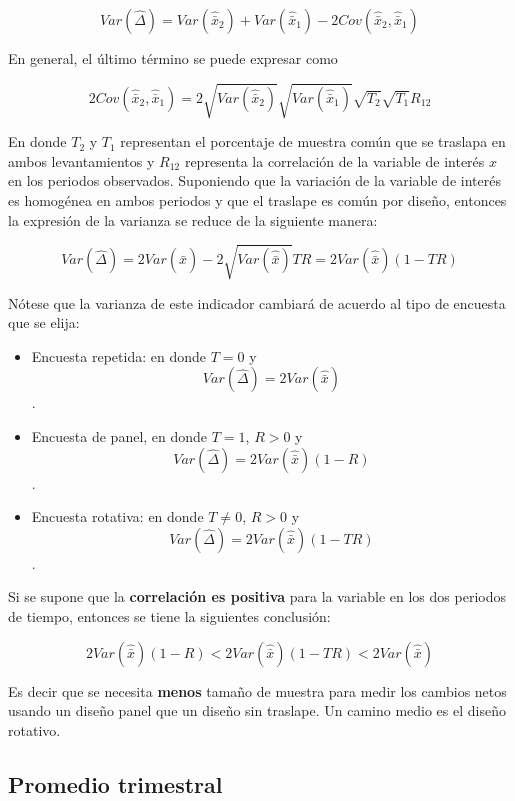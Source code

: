 \documentclass[
  12pt,
  spanish,
]{book}
\providecommand{\tightlist}{%
  \setlength{\itemsep}{0pt}\setlength{\parskip}{0pt}}
\begin{document}
\[
Var(\hat{\Delta}) = Var(\hat{\bar{x}}_2) + Var(\hat{\bar{x}}_1) - 2Cov(\hat{\bar{x}}_2, \hat{\bar{x}}_1)
\]

En general, el último término se puede expresar como

\[
2Cov(\hat{\bar{x}}_2, \hat{\bar{x}}_1) = 
2\sqrt{Var(\hat{\bar{x}}_2)}\sqrt{Var(\hat{\bar{x}}_1)}\sqrt{T_2}\sqrt{T_1}R_{12}
\]

En donde \(T_2\) y \(T_1\) representan el porcentaje de muestra común que se traslapa en ambos levantamientos y \(R_{12}\) representa la correlación de la variable de interés \(x\) en los periodos observados. Suponiendo que la variación de la variable de interés es homogénea en ambos periodos y que el traslape es común por diseño, entonces la expresión de la varianza se reduce de la siguiente manera:

\[
Var(\hat{\Delta}) = 2Var(\hat{\bar{x}}) - 2\sqrt{Var(\hat{\bar{x}})}TR
=2Var(\hat{\bar{x}})(1-TR) 
\]

Nótese que la varianza de este indicador cambiará de acuerdo al tipo de encuesta que se elija:

\begin{itemize}
\tightlist
\item
  Encuesta repetida: en donde \(T=0\) y
  \[Var(\hat{\Delta}) = 2Var(\hat{\bar{x}})\].
\item
  Encuesta de panel, en donde \(T=1\), \(R > 0\) y
  \[Var(\hat{\Delta}) = 2Var(\hat{\bar{x}})(1-R)\].
\item
  Encuesta rotativa: en donde \(T\neq 0\), \(R > 0\) y
  \[Var(\hat{\Delta}) = 2Var(\hat{\bar{x}})(1-TR)\].
\end{itemize}

Si se supone que la \textbf{correlación es positiva} para la variable en los dos periodos de tiempo, entonces se tiene la siguientes conclusión:

\[
2Var(\hat{\bar{x}})(1-R) < 2Var(\hat{\bar{x}})(1-TR) < 2Var(\hat{\bar{x}})
\]

Es decir que se necesita \textbf{menos} tamaño de muestra para medir los cambios netos usando un diseño panel que un diseño sin traslape. Un camino medio es el diseño rotativo.

\hypertarget{promedio-trimestral}{%
\subsection*{Promedio trimestral}\label{promedio-trimestral}}
\end{document}
